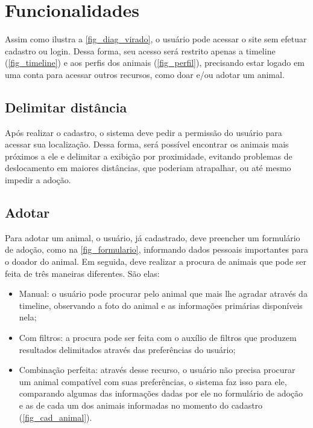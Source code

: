 \chapter{Funcionalidades}
Assim como ilustra a \autoref{fig_diag_virado}, o usuário pode acessar o site sem efetuar cadastro ou login. Dessa forma, seu acesso será restrito apenas a timeline (\autoref{fig_timeline}) e aos perfis dos animais (\autoref{fig_perfil}), precisando estar logado em uma conta para acessar outros recursos, como doar e/ou adotar um animal.

\section{Delimitar distância}
Após realizar o cadastro, o sistema deve pedir a permissão do usuário para acessar sua localização. Dessa forma, será possível encontrar os animais mais próximos a ele e delimitar a exibição por proximidade, evitando problemas de deslocamento em maiores distâncias, que poderiam atrapalhar, ou até mesmo impedir a adoção.

\section{Adotar}
Para adotar um animal, o usuário, já cadastrado, deve preencher um formulário de adoção, como na \autoref{fig_formulario}, informando dados pessoais importantes para o doador do animal. Em seguida, deve realizar a procura de animais que pode ser feita de três maneiras diferentes. São elas: 
\begin{itemize}
\item Manual: o usuário pode procurar pelo animal que mais lhe agradar através da timeline, observando a foto do animal e as informações primárias disponíveis nela;
\item Com filtros: a procura pode ser feita com o auxílio de filtros que produzem resultados delimitados através das preferências do usuário;
\item Combinação perfeita: através desse recurso, o usuário não precisa procurar um animal compatível com suas preferências, o sistema faz isso para ele, comparando algumas das informações dadas por ele no formulário de adoção e as de cada um dos animais informadas no momento do cadastro (\autoref{fig_cad_animal}).
\end{itemize}

